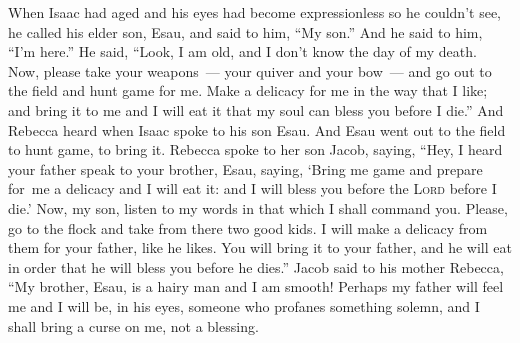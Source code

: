 
\begin{inparaenum}
   When Isaac had aged and his eyes had become expressionless so he couldn't see, he called his elder son, Esau, and said to him, ``My son.'' And he said to him, ``I'm here.''%
   He said, ``Look, I am old, and I don't know the day of my death.%
   Now, please take your weapons~--- your quiver and your bow~--- and go out to the field and hunt game for me.%
   Make a delicacy%
  for me in the way that%
  I like; and bring it to me and I will eat it that my soul can bless you before I die.''%
   And Rebecca heard when Isaac spoke to his son Esau. And Esau went out to the field to hunt game, to bring it.%
   Rebecca spoke to her son Jacob, saying, ``Hey, I heard your father speak to your brother, Esau, saying,%
   `Bring me game and prepare for\understood\ me a delicacy and I will eat it: and I will bless you before the \textsc{Lord} before I die.'%
   Now, my son, listen to my words in that which I shall command you.%
   Please, go to the flock and take from there two good kids. I will make a delicacy from them for your father, like he likes.%
   You will bring it to your father, and he will eat in order%
  that he will bless you before he dies.''%
   Jacob said to his mother Rebecca, ``My brother, Esau, is a hairy man and I am smooth!%
   Perhaps my father will feel me and I will be, in his eyes, someone who profanes something solemn,%
  and I shall bring a curse on me, not a blessing.%
  

\end{inparaenum}
